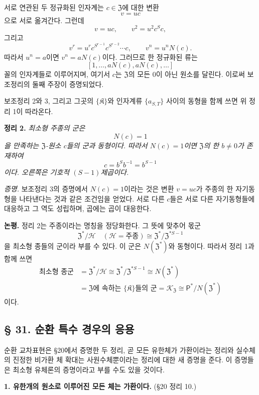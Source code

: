 서로 연관된 두 정규화된 인자계는 \(c\in\mathfrak Z\)에 대한 변환
\[
        v=uc
\]
으로 서로 옮겨간다. 그런데
\[
        v=uc,
        \qquad
        v^2=u^2c^Sc,
\]
그리고
\[
        v^r=u^r c^{S^{r-1}}c^{S^{r-2}}\cdots c,
        \qquad
        v^n=u^nN(c).
\]
따라서 \(u^n=a\)이면 \(v^n=aN(c)\)이다. 그러므로 한 정규화된 류는
\[
        [1,\ldots,aN(c),aN(c),\ldots]
\]
꼴의 인자계들로 이루어지며, 여기서 \(c\)는 \(\mathfrak Z\)의 모든 \(0\)이 아닌 원소를 달린다. 이로써 보조정리의 둘째 주장이 증명되었다.

보조정리 2와 3, 그리고 그곳의 \(\{\mathfrak K\}\)와 인자계류 \(\{a_{S,T}\}\) 사이의 동형을 함께 쓰면 위 정리 1이 따라온다.

\noindent\textbf{정리 2.} \emph{최소형 주종의 군은}
\[
        N(c)=1
\]
\emph{을 만족하는 \(\mathfrak Z\)-원소 \(c\)들의 군과 동형이다. 따라서 \(N(c)=1\)이면 \(\mathfrak Z\)의 한 \(b\ne0\)가 존재하여}
\[
        c=b^Sb^{-1}=b^{S-1}
\]
\emph{이다. 오른쪽은 기호적 \((S-1)\)제곱이다.}

\noindent\emph{증명.} 보조정리 3의 증명에서 \(N(c)=1\)이라는 것은 변환 \(v=uc\)가 주종의 한 자기동형을 나타낸다는 것과 같은 조건임을 얻었다. 서로 다른 \(c\)들은 서로 다른 자기동형들에 대응하고 그 역도 성립하며, 곱에는 곱이 대응한다.

\noindent\textbf{논평.} 정리 2는 주종이라는 명칭을 정당화한다. 그 뜻에 맞추어 몫군
\[
        \mathfrak Z^*/\mathscr H
        \quad(\mathscr H=\text{주종})
        \cong
        \mathfrak Z^*/\mathfrak Z^{*S-1}
\]
을 최소형 종들의 군이라 부를 수 있다. 이 군은 \(N(\mathfrak Z^*)\)와 동형이다. 따라서 정리 1과 함께 쓰면
\[
\begin{aligned}
\text{최소형 종군}
 &=\mathfrak Z^*/\mathscr H
  \cong\mathfrak Z^*/\mathfrak Z^{*S-1}
  \cong N(\mathfrak Z^*)\\
 &=\mathfrak Z\text{에 속하는 }\{\mathfrak K\}\text{들의 군}
  =\mathscr K_{\mathfrak Z}
  \cong\mathsf P^*/N(\mathfrak Z^*)
\end{aligned}
\]
이다.

\subsection*{§ 31. 순환 특수 경우의 응용}

순환 교차표현은 §20에서 증명한 두 정리, 곧 모든 유한체가 가환이라는 정리와 실수체의 진정한 비가환 체 확대는 사원수체뿐이라는 정리에 대한 새 증명을 준다. 이 증명들은 최소형 유체론의 증명이라고 부를 수도 있을 것이다.

\noindent\textbf{1. 유한개의 원소로 이루어진 모든 체는 가환이다.} (§20 정리 10.)


